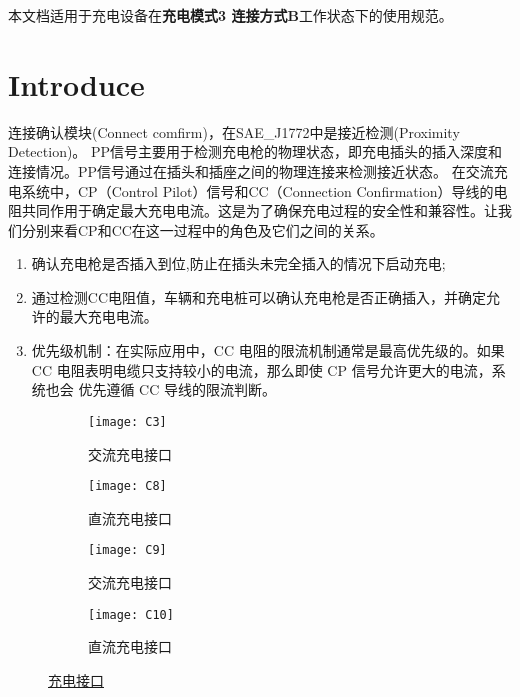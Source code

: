 本文档适用于充电设备在{\bf 充电模式3 连接方式B}工作状态下的使用规范。

\section{Introduce}
    连接确认模块(Connect comfirm)，在SAE\_J1772中是接近检测(Proximity Detection)\cite{SAE}。 
    PP信号主要用于检测充电枪的物理状态，即充电插头的插入深度和连接情况。PP信号通过在插头和插座之间的物理连接来检测接近状态。
    在交流充电系统中，CP（Control Pilot）信号和CC（Connection Confirmation）导线的电阻共同作用于确定最大充电电流。这是为了确保充电过程的安全性和兼容性。让我们分别来看CP和CC在这一过程中的角色及它们之间的关系。

 \begin{enumerate}
    \item  \textcolor{myred3}{确认充电枪是否插入到位},防止在插头未完全插入的情况下启动充电;
    \item  通过检测CC电阻值，车辆和充电桩可以确认充电枪是否正确插入，并\textcolor{myred3}{确定允许的最大充电电流}。
    \item 优先级机制：在实际应用中，CC 电阻的限流机制通常是最高优先级的。如果 CC
    电阻表明电缆只支持较小的电流，那么即使 CP 信号允许更大的电流，系统也会
    优先遵循 CC 导线的限流判断。
 \end{enumerate}


\begin{figure}[!htbp]
    \centering
    \begin{subfigure}[b]{0.45\textwidth}
        \centering
        \texttt{[image: C3]} 
        \caption{交流充电接口}
        \label{fig:C3}
    \end{subfigure}
    \hspace*{-0.6cm}
    \begin{subfigure}[b]{0.45\textwidth}
        \centering
        \texttt{[image: C8]} 
        \caption{直流充电接口}
        \label{fig:C8}
    \end{subfigure}
    \begin{subfigure}[b]{0.45\textwidth}
        \centering
        \texttt{[image: C9]} 
        \caption{交流充电接口\cite{GB20234_2}}
        \label{fig:C9}
    \end{subfigure}
    \hspace*{-0.6cm}
    \begin{subfigure}[b]{0.45\textwidth}
        \centering
        \texttt{[image: C10]} 
        \caption{直流充电接口\cite{GB20234_3}}
        \label{fig:C10}
    \end{subfigure}
    \caption{\href{https://www.chooseauto.com.cn/news/89436.shtml}{充电接口}}
    \label{fig:main}
\end{figure}



